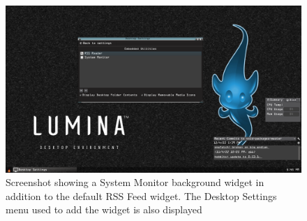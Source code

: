 %

\begin{figure}[!h]
  \centering
   \includegraphics[totalheight=3in,width=1.0\textwidth]{embed.png}
  \caption{Screenshot showing a System Monitor background widget in addition to the default RSS Feed widget. The Desktop Settings menu used to add the widget is also displayed}
  \label{fig:embed}
\end{figure}

%

